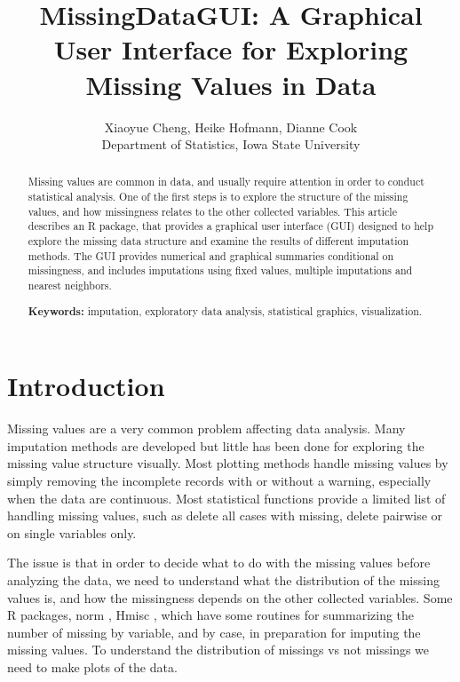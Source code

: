 \documentclass[english]{article}
\newcommand{\pkg}[1]{{\fontseries{b}\selectfont #1}}
\begin{document}
\title{MissingDataGUI: A Graphical User Interface for Exploring Missing Values in Data}


\author{Xiaoyue Cheng, Heike Hofmann, Dianne Cook \\ Department of Statistics, Iowa State University}

\maketitle
\begin{abstract}
Missing values are common in data, and usually require attention in order to conduct statistical analysis.  One of the first steps is to explore the structure of the missing values, and how missingness relates to the other collected variables.  This article describes an R package, that provides a graphical user interface (GUI) designed to help explore the missing data structure and examine the results of different imputation methods. The GUI provides numerical and graphical summaries conditional on missingness, and includes  imputations using fixed values, multiple imputations and nearest neighbors.

\textbf{Keywords:} imputation, exploratory data analysis, statistical graphics, visualization.
\end{abstract}

\section{Introduction}

Missing values are a very common problem affecting data analysis. Many imputation methods are developed but little has been done for exploring the missing value structure visually.  Most plotting methods handle missing values by simply removing the incomplete records with or without a warning, especially when the data are continuous. Most statistical functions provide a limited list of handling missing values, such as delete all cases with missing, delete pairwise or on single variables only.

The issue is that in order to decide what to do with the missing values before analyzing the data, we need to understand what the distribution of the missing values is, and how the missingness depends on the other collected variables. Some R packages, \pkg{norm} \citep{norm}, \pkg{Hmisc} \citep{hmisc}, which have some routines for summarizing the number of missing by variable, and by case, in preparation for imputing the missing values. To understand the distribution of missings vs not missings we need to make plots of the data.
\end{document}
